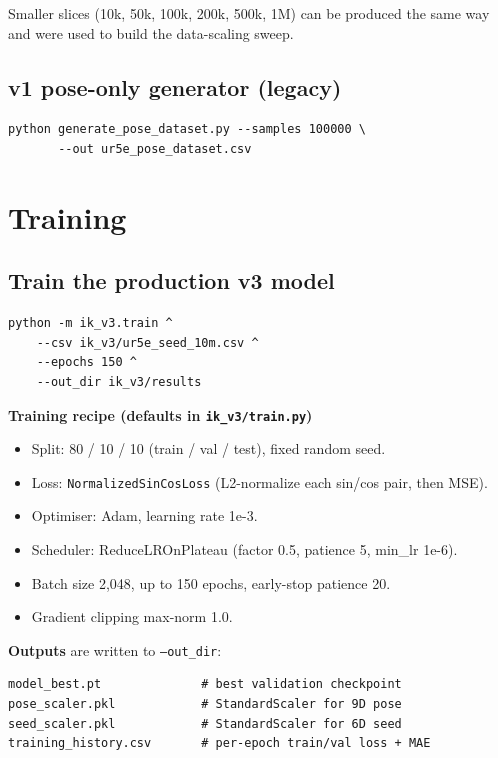 \documentclass[11pt]{article}
\begin{document}
\noindent Smaller slices (10k, 50k, 100k, 200k, 500k, 1M) can be produced
the same way and were used to build the data-scaling sweep.

\subsection{v1 pose-only generator (legacy)}

\begin{lstlisting}[style=shell]
python generate_pose_dataset.py --samples 100000 \
       --out ur5e_pose_dataset.csv
\end{lstlisting}

\section{Training}

\subsection{Train the production v3 model}

\begin{lstlisting}[style=shell]
python -m ik_v3.train ^
    --csv ik_v3/ur5e_seed_10m.csv ^
    --epochs 150 ^
    --out_dir ik_v3/results
\end{lstlisting}

\noindent\textbf{Training recipe (defaults in \texttt{ik\_v3/train.py})}
\begin{itemize}[leftmargin=*]
    \item Split: 80 / 10 / 10 (train / val / test), fixed random seed.
    \item Loss: \texttt{NormalizedSinCosLoss} (L2-normalize each sin/cos
          pair, then MSE).
    \item Optimiser: Adam, learning rate 1e-3.
    \item Scheduler: ReduceLROnPlateau (factor 0.5, patience 5,
          min\_lr 1e-6).
    \item Batch size 2{,}048, up to 150 epochs, early-stop patience 20.
    \item Gradient clipping max-norm 1.0.
\end{itemize}

\noindent\textbf{Outputs} are written to \texttt{--out\_dir}:
\begin{lstlisting}[style=shell]
model_best.pt              # best validation checkpoint
pose_scaler.pkl            # StandardScaler for 9D pose
seed_scaler.pkl            # StandardScaler for 6D seed
training_history.csv       # per-epoch train/val loss + MAE
\end{lstlisting}
\end{document}
